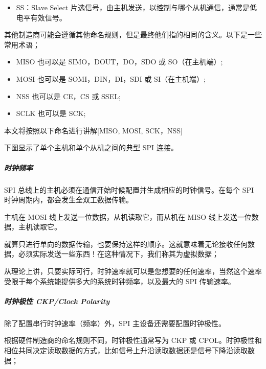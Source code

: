 \documentclass[a4paper,12pt,english]{sphinxmanual}
\begin{document}
{{\begin{itemize}
\item {} 
\sphinxAtStartPar
SS：Slave Select 片选信号，由主机发送，以控制与哪个从机通信，通常是低电平有效信号。

\end{itemize}

\sphinxAtStartPar
其他制造商可能会遵循其他命名规则，但是最终他们指的相同的含义。以下是一些常用术语；
\begin{itemize}
\item {} 
\sphinxAtStartPar
MISO 也可以是 SIMO，DOUT，DO，SDO 或 SO（在主机端）;

\item {} 
\sphinxAtStartPar
MOSI 也可以是 SOMI，DIN，DI，SDI 或 SI（在主机端）;

\item {} 
\sphinxAtStartPar
NSS 也可以是 CE，CS 或 SSEL;

\item {} 
\sphinxAtStartPar
SCLK 也可以是 SCK;

\end{itemize}

\sphinxAtStartPar
本文将按照以下命名进行讲解{[}MISO, MOSI, SCK，NSS{]}

\sphinxAtStartPar
下图显示了单个主机和单个从机之间的典型 SPI 连接。

\sphinxAtStartPar
{}


\subparagraph{时钟频率}
\label{\detokenize{exp-esp32/peripherals/lcd_spi:id4}}
\sphinxAtStartPar
SPI 总线上的主机必须在通信开始时候配置并生成相应的时钟信号。在每个 SPI 时钟周期内，都会发生全双工数据传输。

\sphinxAtStartPar
主机在 MOSI 线上发送一位数据，从机读取它，而从机在 MISO 线上发送一位数据，主机读取它。

\sphinxAtStartPar
就算只进行单向的数据传输，也要保持这样的顺序。这就意味着无论接收任何数据，必须实际发送一些东西！在这种情况下，我们称其为虚拟数据；

\sphinxAtStartPar
从理论上讲，只要实际可行，时钟速率就可以是您想要的任何速率，当然这个速率受限于每个系统能提供多大的系统时钟频率，以及最大的 SPI 传输速率。


\subparagraph{时钟极性 CKP/Clock Polarity}
\label{\detokenize{exp-esp32/peripherals/lcd_spi:ckp-clock-polarity}}
\sphinxAtStartPar
除了配置串行时钟速率（频率）外，SPI 主设备还需要配置时钟极性。

\sphinxAtStartPar
根据硬件制造商的命名规则不同，时钟极性通常写为 CKP 或 CPOL。时钟极性和相位共同决定读取数据的方式，比如信号上升沿读取数据还是信号下降沿读取数据；

}}
\end{document}
